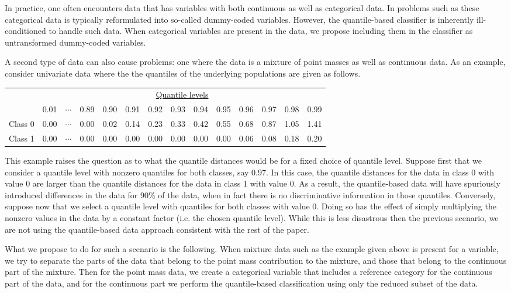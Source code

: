 \documentclass{article}
\begin{document}
In practice, one often encounters data that has variables with both continuous
as well as categorical data.  In problems such as these categorical data is
typically reformulated into so-called dummy-coded variables.  However, the
quantile-based classifier is inherently ill-conditioned to handle such data.
When categorical variables are present in the data, we propose including them in
the classifier as untransformed dummy-coded variables.

A second type of data can also cause problems:  one where the data is a mixture
of point masses as well as continuous data.  As an example, consider univariate
data where the the quantiles of the underlying populations are given as follows.
\begin{center}
  \begin{tabular}{lrrrrrrrrrrrrr}
    \toprule
    & \multicolumn{13}{c}{\underline{Quantile levels}} \\
    & 0.01 & $\cdots$ & 0.89 & 0.90 & 0.91 & 0.92 & 0.93 & 0.94 & 0.95 & 0.96 & 0.97 & 0.98 & 0.99 \\
    \midrule
    Class 0 \hspace{5mm} & 0.00 & $\cdots$ & 0.00 & 0.02 & 0.14 & 0.23 & 0.33 & 0.42 & 0.55 & 0.68 & 0.87 & 1.05 & 1.41 \\
    Class 1 & 0.00 & $\cdots$ & 0.00 & 0.00 & 0.00 & 0.00 & 0.00 & 0.00 & 0.00 & 0.06 & 0.08 & 0.18 & 0.20 \\
    \bottomrule
  \end{tabular}
\end{center}
This example raises the question as to what the quantile distances would be for
a fixed choice of quantile level.  Suppose first that we consider a quantile
level with nonzero quantiles for both classes, say 0.97.  In this case, the
quantile distances for the data in class 0 with value 0 are larger than the
quantile distances for the data in class 1 with value 0.  As a result, the
quantile-based data will have spuriously introduced differences in the data for
90\% of the data, when in fact there is no discriminative information in those
quantiles.  Conversely, suppose now that we select a quantile level with
quantiles for both classes with value 0.  Doing so has the effect of simply
multiplying the nonzero values in the data by a constant factor (i.e. the chosen
quantile level).  While this is less disastrous then the previous scenario, we
are not using the quantile-based data approach consistent with the rest of the
paper.

What we propose to do for such a scenario is the following.  When mixture data
such as the example given above is present for a variable, we try to separate
the parts of the data that belong to the point mass contribution to the mixture,
and those that belong to the continuous part of the mixture.  Then for the point
mass data, we create a categorical variable that includes a reference category
for the continuous part of the data, and for the continuous part we perform the
quantile-based classification using only the reduced subset of the data.




\end{document}
